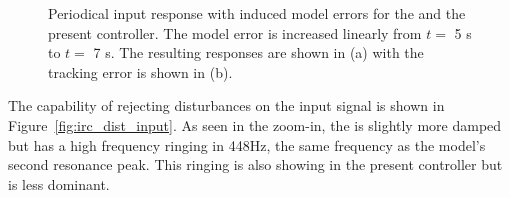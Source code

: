\begin{figure}[h!]
  \centering %
  \qquad
  \caption{\label{fig:irc_dist} Periodical input response with induced model errors for the \abbrIRC and the present controller. The model error is increased linearly from $t=$ 5 s to $t=$ 7 s. The resulting responses are shown in (a) with the tracking error is shown in (b).}
\end{figure}

\FloatBarrier
The capability of rejecting disturbances on the input signal is shown in Figure~\ref{fig:irc_dist_input}. As seen in the zoom-in, the \abbrIRC is slightly more damped but has a high frequency ringing in 448Hz, the same frequency as the model's second resonance peak. This ringing is also showing in the present controller but is less dominant.

